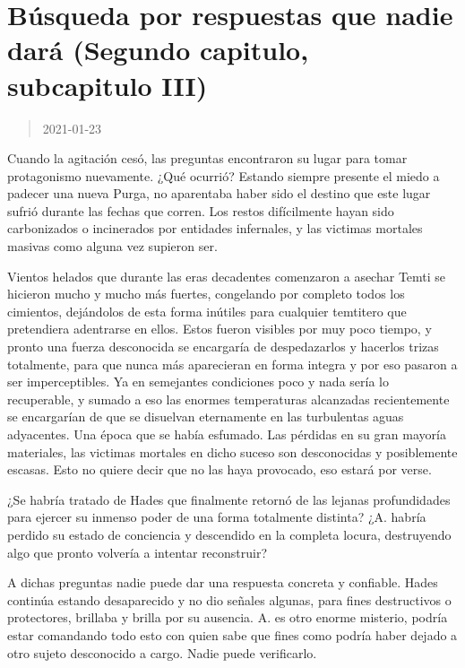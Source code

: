 \documentclass[
  spanish,
]{book}
\begin{document}
\hypertarget{buxfasqueda-por-respuestas-que-nadie-daruxe1-segundo-capitulo-subcapitulo-iii}{%
\section{Búsqueda por respuestas que nadie dará (Segundo capitulo, subcapitulo III)}\label{buxfasqueda-por-respuestas-que-nadie-daruxe1-segundo-capitulo-subcapitulo-iii}}

\begin{quote}
2021-01-23
\end{quote}

Cuando la agitación cesó, las preguntas encontraron su lugar para tomar protagonismo nuevamente. ¿Qué ocurrió? Estando siempre presente el miedo a padecer una nueva Purga, no aparentaba haber sido el destino que este lugar sufrió durante las fechas que corren. Los restos difícilmente hayan sido carbonizados o incinerados por entidades infernales, y las victimas mortales masivas como alguna vez supieron ser.

Vientos helados que durante las eras decadentes comenzaron a asechar Temti se hicieron mucho y mucho más fuertes, congelando por completo todos los cimientos, dejándolos de esta forma inútiles para cualquier temtitero que pretendiera adentrarse en ellos. Estos fueron visibles por muy poco tiempo, y pronto una fuerza desconocida se encargaría de despedazarlos y hacerlos trizas totalmente, para que nunca más aparecieran en forma integra y por eso pasaron a ser imperceptibles. Ya en semejantes condiciones poco y nada sería lo recuperable, y sumado a eso las enormes temperaturas alcanzadas recientemente se encargarían de que se disuelvan eternamente en las turbulentas aguas adyacentes. Una época que se había esfumado. Las pérdidas en su gran mayoría materiales, las victimas mortales en dicho suceso son desconocidas y posiblemente escasas. Esto no quiere decir que no las haya provocado, eso estará por verse.

¿Se habría tratado de Hades que finalmente retornó de las lejanas profundidades para ejercer su inmenso poder de una forma totalmente distinta? ¿A. habría perdido su estado de conciencia y descendido en la completa locura, destruyendo algo que pronto volvería a intentar reconstruir?

A dichas preguntas nadie puede dar una respuesta concreta y confiable. Hades continúa estando desaparecido y no dio señales algunas, para fines destructivos o protectores, brillaba y brilla por su ausencia. A. es otro enorme misterio, podría estar comandando todo esto con quien sabe que fines como podría haber dejado a otro sujeto desconocido a cargo. Nadie puede verificarlo.
\end{document}
